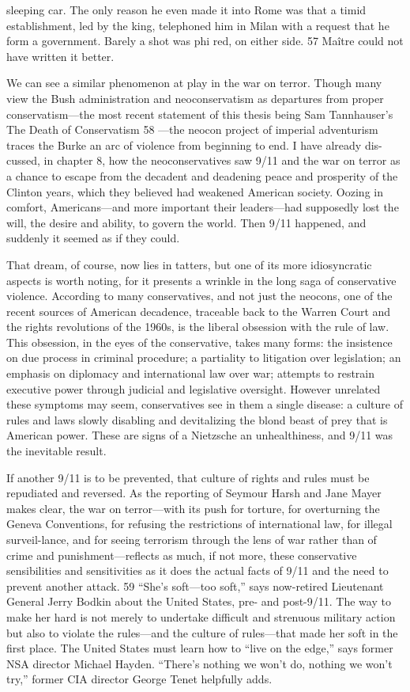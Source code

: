 sleeping car. The only reason he even made it into Rome was that a timid establishment, led by the king, telephoned him in Milan with a request that he form a government. Barely a shot was phi red, on either side. {\color{blue} 57 } Maître could not have written it better.{\par} We can see a similar phenomenon at play in the war on terror. Though many view the Bush administration and neoconservatism as departures from proper conservatism—the most recent statement of this thesis being Sam Tannhauser’s The Death of Conservatism {\color{blue} 58 } —the neocon project of imperial adventurism traces the Burke an arc of violence from beginning to end. I have already dis-cussed, in chapter 8, how the neoconservatives saw 9/11 and the war on terror as a chance to escape from the decadent and deadening peace and prosperity of the Clinton years, which they believed had weakened American society. Oozing in comfort, Americans—and more important their leaders—had supposedly lost the will, the desire and ability, to govern the world. Then 9/11 happened, and suddenly it seemed as if they could.{\par} That dream, of course, now lies in tatters, but one of its more idiosyncratic aspects is worth noting, for it presents a wrinkle in the long saga of conservative violence. According to many conservatives, and not just the neocons, one of the recent sources of American decadence, traceable back to the Warren Court and the rights revolutions of the 1960s, is the liberal obsession with the rule of law. This obsession, in the eyes of the conservative, takes many forms: the insistence on due process in criminal procedure; a partiality to litigation over legislation; an emphasis on diplomacy and international law over war; attempts to restrain executive power through judicial and legislative oversight. However unrelated these symptoms may seem, conservatives see in them a single disease: a culture of rules and laws slowly disabling and devitalizing the blond beast of prey that is American power. These are signs of a Nietzsche an unhealthiness, and 9/11 was the inevitable result.{\par} If another 9/11 is to be prevented, that culture of rights and rules must be repudiated and reversed. As the reporting of Seymour Harsh and Jane Mayer makes clear, the war on terror—with its push for torture, for overturning the Geneva Conventions, for refusing the restrictions of international law, for illegal surveil-lance, and for seeing terrorism through the lens of war rather than of crime and punishment—reflects as much, if not more, these conservative sensibilities and sensitivities as it does the actual facts of 9/11 and the need to prevent another attack. {\color{blue} 59 } “She’s soft—too soft,” says now-retired Lieutenant General Jerry Bodkin about the United States, pre- and post-9/11. The way to make her hard is not merely to undertake difficult and strenuous military action but also to violate the rules—and the culture of rules—that made her soft in the first place. The United States must learn how to “live on the edge,” says former NSA director Michael Hayden. “There’s nothing we won’t do, nothing we won’t try,” former CIA director George Tenet helpfully adds. 